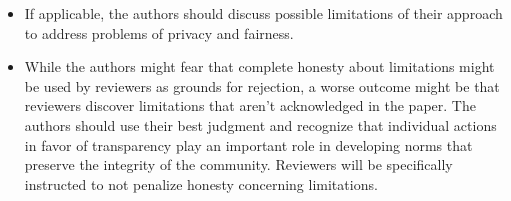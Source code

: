 \documentclass{article}
\begin{document}
\begin{enumerate}
\begin{itemize}
        \item If applicable, the authors should discuss possible limitations of their approach to address problems of privacy and fairness.
        \item While the authors might fear that complete honesty about limitations might be used by reviewers as grounds for rejection, a worse outcome might be that reviewers discover limitations that aren't acknowledged in the paper. The authors should use their best judgment and recognize that individual actions in favor of transparency play an important role in developing norms that preserve the integrity of the community. Reviewers will be specifically instructed to not penalize honesty concerning limitations.
    \end{itemize}

\end{enumerate}
\end{document}
